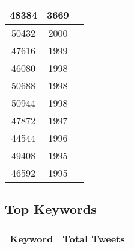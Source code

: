 \documentclass{article}\usepackage[T1]{fontenc}
\begin{document}
\begin{tabular}{|c|c|c|}
 \hline
48384 & 3669\\ 
 \hline
50432 & 2000\\ 
 \hline
47616 & 1999\\ 
 \hline
46080 & 1998\\ 
 \hline
50688 & 1998\\ 
 \hline
50944 & 1998\\ 
 \hline
47872 & 1997\\ 
 \hline
44544 & 1996\\ 
 \hline
49408 & 1995\\ 
 \hline
46592 & 1995\\ 
 \hline
\end{tabular}\subsection*{Top Keywords}\begin{tabular}{|c|c|}         \hline         Keyword & Total Tweets \\ 
 \hline
\end{tabular}
\end{document}
